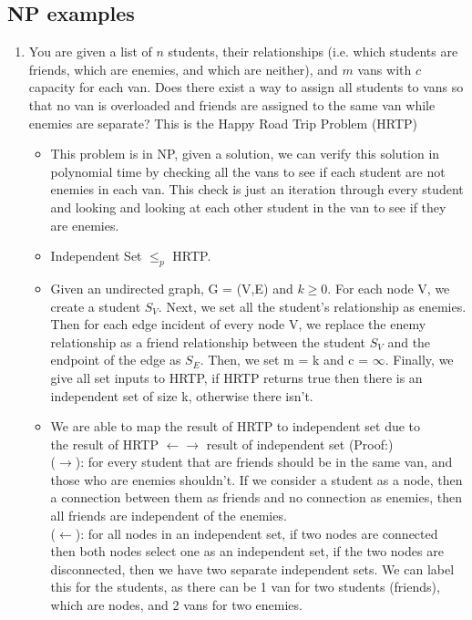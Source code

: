 \documentclass[]{article}
\begin{document}
\subsection{NP examples}
\begin{enumerate}
    \item You are given a list of $n$ students, their relationships (i.e. which students are friends, which are enemies, and which are neither), and $m$ vans with $c$ capacity for each van. Does there exist a way to assign all students to vans so that no van is overloaded and friends are assigned to the same van while enemies are separate? This is the Happy Road Trip Problem (HRTP)
    \begin{itemize}
        \item This problem is in NP, given a solution, we can verify this solution in polynomial time by checking all the vans to see if each student are not enemies in each van. This check is just an iteration through every student and looking and looking at each other student in the van to see if they are enemies.
        \item Independent Set $\leq_p$ HRTP.
        \item Given an undirected graph, G = (V,E) and $k \geq 0$. For each node V, we create a student $S_V$. Next, we set all the student's relationship as enemies. Then for each edge incident of every node V, we replace the enemy relationship as a friend relationship between the student $S_V$ and the endpoint of the edge as $S_E$. Then, we set m = k and c = $\infty$. Finally, we give all set inputs to HRTP, if HRTP returns true then there is an independent set of size k, otherwise there isn't.
        \item We are able to map the result of HRTP to independent set due to \\the result of HRTP $\leftarrow\rightarrow$ result of independent set (Proof:)\\
        ($\rightarrow$): for every student that are friends should be in the same van, and those who are enemies shouldn't. If we consider a student as a node, then a connection between them as friends and no connection as enemies, then all friends are independent of the enemies. \\
        ($\leftarrow$): for all nodes in an independent set, if two nodes are connected then both nodes select one as an independent set, if the two nodes are disconnected, then we have two separate independent sets. We can label this for the students, as there can be 1 van for two students (friends), which are nodes, and 2 vans for two enemies.

\end{itemize}
\end{enumerate}
\end{document}
